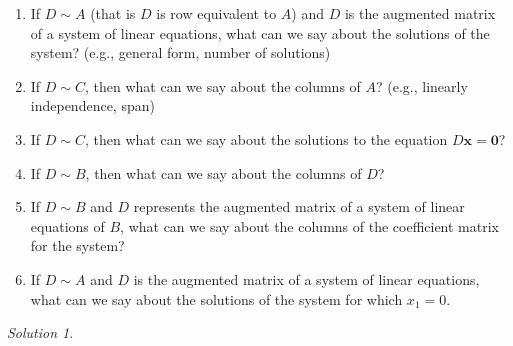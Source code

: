 \documentclass{article}
\theoremstyle{remark}
\newtheorem*{solution}{Solution}
\begin{document}
\begin{enumerate}
\item If $D \sim A$ (that is $D$ is row equivalent to $A$) and $D$ is the augmented matrix of a system of linear equations, what can we say about the solutions of the system? (e.g., general form, number of solutions)
\item If $D \sim C$, then what can we say about the columns of $A$? (e.g., linearly independence, span)
\item If $D \sim C$, then what can we say about the solutions to the equation $D\mathbf x = \mathbf 0$?
\item If $D \sim B$, then what can we say about the columns of $D$?
\item If $D \sim B$ and $D$ represents the augmented matrix of a system of linear equations of $B$, what can we say about the columns of the coefficient matrix for the system?
\item If $D \sim A$ and $D$ is the augmented matrix of a system of linear equations, what can we say about the solutions of the system for which $x_1 = 0$.

\end{enumerate}

\medskip

\begin{solution}
\end{solution}

\pagebreak
\end{document}
